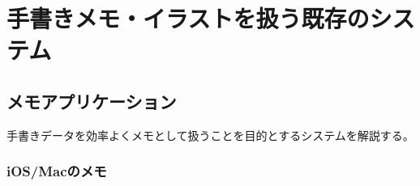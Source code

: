 \section{手書きメモ・イラストを扱う既存のシステム}

%
%
%

\subsection{メモアプリケーション}
手書きデータを効率よくメモとして扱うことを目的とするシステムを解説する。

\subsubsection{iOS/Macのメモ}

